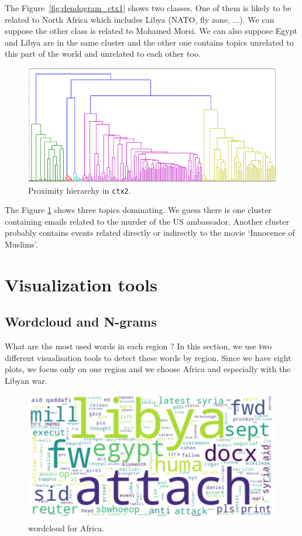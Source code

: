 \documentclass[11pt]{article}
\begin{document}
The Figure~\ref{fig:dendogram_ctx1} shows two classes. One of them is likely to be related to North Africa which includes Libya (NATO, fly zone, ...). We can suppose the other class is related to Mohamed Morsi. We can also suppose Egypt and Libya are in the same cluster and the other one contains topics unrelated to this part of the world and unrelated to each other too.

\begin{figure}[h]
	\centering
	\includegraphics[width=\linewidth]{images/dendogram_ctx2.png}
	\caption{Proximity hierarchy in \texttt{ctx2}.}
	\label{fig:dendogram_ctx2}
\end{figure}

The Figure \ref{fig:dendogram_ctx2} shows three topics dominating. We guess there is one cluster containing emails related to the murder of the US ambassador. Another cluster probably contains events related directly or indirectly to the movie `Innocence of Muslims'.

\section{Visualization tools}

\subsection{Wordcloud and N-grams}
What are the most used words in each region ? In this section, we use two different visualisation tools to detect these words by region. Since we have eight plots, we focus only on one region and we choose Africa and especially with the Libyan war.

\begin{figure}[h]
	\centering
	\includegraphics[width=\linewidth]{images/wordcloud_africa.png}
	\caption{wordcloud for Africa.}
	\label{fig:wordcloudaf}
\end{figure}
\end{document}
